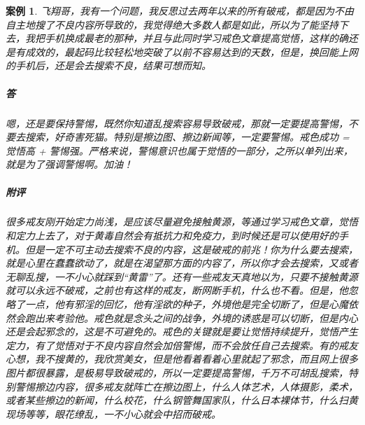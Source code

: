 \documentclass{ctexart}
\newtheorem{case}{案例}
\begin{document}
\begin{case}
    飞翔哥，我有一个问题，我反思过去两年以来的所有破戒，都是因为不由自主地搜了不良内容所导致的，我觉得绝大多数人都是如此，所以为了能坚持下去，我把手机换成最老的那种，并且与此同时学习戒色文章提高觉悟，这样的确还是有成效的，最起码比较轻松地突破了以前不容易达到的天数，但是，换回能上网的手机后，还是会去搜索不良，结果可想而知。
    \subparagraph{答} 嗯，还是要保持警惕，既然你知道乱搜索容易导致破戒，那就一定要提高警惕，不要去搜索，好奇害死猫。特别是擦边图、擦边新闻等，一定要警惕。戒色成功 = 觉悟高 + 警惕强。严格来说，警惕意识也属于觉悟的一部分，之所以单列出来，就是为了强调警惕啊。加油！
    \subparagraph{附评} 很多戒友刚开始定力尚浅，是应该尽量避免接触黄源，等通过学习戒色文章，觉悟和定力上去了，对于黄毒自然会有抵抗力和免疫力，到时候还是可以使用好的手机。但是一定不可主动去搜索不良的内容，这是破戒的前兆！你为什么要去搜索，就是心里在蠢蠢欲动了，就是在渴望那方面的内容了，所以你才会去搜索，又或者无聊乱搜，一不小心就踩到“黄雷”了。还有一些戒友天真地以为，只要不接触黄源就可以永远不破戒，之前也有这样的戒友，断网断手机，什么也不看。但是，他忽略了一点，他有邪淫的回忆，他有淫欲的种子，外境他是完全切断了，但是心魔依然会跑出来考验他。戒色就是念头之间的战争，外境的诱惑是可以切断，但是内心还是会起邪念的，这是不可避免的。戒色的关键就是要让觉悟持续提升，觉悟产生定力，有了觉悟对于不良内容自然会加倍警惕，而不会放任自己去搜索。有的戒友心想，我不搜黄的，我欣赏美女，但是他看着看着心里就起了邪念，而且网上很多图片都很暴露，是极易导致破戒的，所以一定要提高警惕，千万不可胡乱搜索，特别警惕擦边内容，很多戒友就阵亡在擦边图上，什么人体艺术，人体摄影，柔术，或者某些擦边的新闻，什么校花，什么钢管舞国家队，什么日本裸体节，什么扫黄现场等等，眼花缭乱，一不小心就会中招而破戒。
\end{case}
\end{document}
